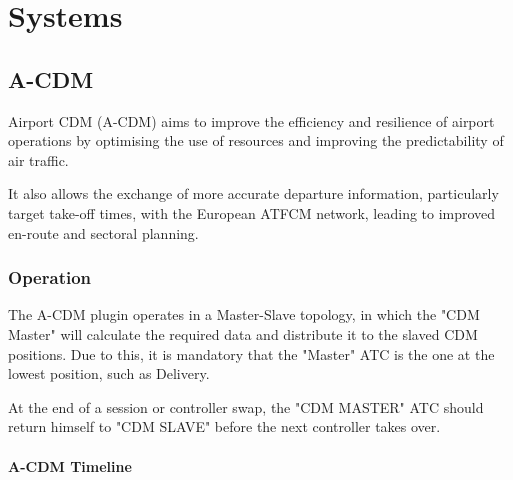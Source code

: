 \documentclass[a4paper,oneside,11pt]{memoir}
\begin{document}
\chapter{Systems}

\section{A-CDM}

Airport CDM (A-CDM) aims to improve the efficiency and resilience of airport operations by optimising the use of resources and improving the predictability of air traffic. 

It also allows the exchange of more accurate departure information, particularly target take-off times, with the European ATFCM network, leading to improved en-route and sectoral planning.\cite{eurocontrol}

\subsection{Operation}

The A-CDM plugin operates in a Master-Slave topology, in which the "CDM Master" will calculate the required data and distribute it to the slaved CDM positions. Due to this, it is mandatory that the "Master" ATC is the one at the lowest position, such as Delivery.



At the end of a session or controller swap, the "CDM MASTER" ATC should return himself to "CDM SLAVE" before the next controller takes over.

\subsubsection{A-CDM Timeline}
\end{document}
